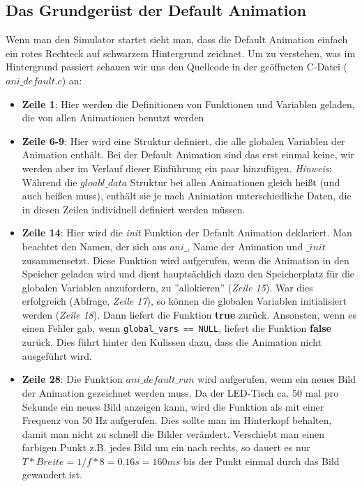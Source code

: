 \documentclass[10pt,a4paper]{article}
\begin{document}
\subsection{Das Grundgerüst der Default Animation}
Wenn man den Simulator startet sieht man, dass die Default Animation einfach ein rotes Rechteck auf schwarzem Hintergrund zeichnet.
Um zu verstehen, was im Hintergrund passiert schauen wir uns den Quellcode in der geöffneten C-Datei (\textit{$ani\_default.c$}) an:

\begin{itemize}
\item \textbf{Zeile 1}: Hier werden die Definitionen von Funktionen und Variablen geladen, die von allen Animationen benutzt werden

\item \textbf{Zeile 6-9}: Hier wird eine Struktur definiert, die alle globalen Variablen der Animation enthält. Bei der Default Animation sind das erst einmal keine, wir werden aber im Verlauf dieser Einführung ein paar hinzufügen. \textit{Hinweis}: Während die \textit{$gloabl\_data$} Struktur bei allen Animationen gleich heißt (und auch heißen muss), enthält sie je nach Animation unterschiedliche Daten, die in diesen Zeilen individuell definiert werden müssen.

\item \textbf{Zeile 14}: Hier wird die \textit{init} Funktion der Default Animation deklariert. Man beachtet den Namen, der sich aus \textit{$ani\_$}, Name der Animation und \textit{$\_init$} zusammensetzt. Diese Funktion wird aufgerufen, wenn die Animation in den Speicher geladen wird und dient hauptsächlich dazu den Speicherplatz für die globalen Variablen anzufordern, zu ''allokieren'' (\textit{Zeile 15}). War dies erfolgreich (Abfrage, \textit{Zeile 17}), so können die globalen Variablen initialisiert werden (\textit{Zeile 18}). Dann liefert die Funktion \textbf{true} zurück. Ansonsten, wenn es einen Fehler gab, wenn \lstinline|global_vars == NULL|, liefert die Funktion \textbf{false} zurück. Dies führt hinter den Kulissen dazu, dass die Animation nicht ausgeführt wird.

\item \textbf{Zeile 28}: Die Funktion \textit{$ani\_default\_run$} wird aufgerufen, wenn ein neues Bild der Animation gezeichnet werden muss. Da der LED-Tisch ca. 50 mal pro Sekunde ein neues Bild anzeigen kann, wird die Funktion als mit einer Frequenz von 50 Hz aufgerufen. Dies sollte man im Hinterkopf behalten, damit man nicht zu schnell die Bilder verändert. Verschiebt man einen farbigen Punkt z.B. jedes Bild um ein nach rechts, so dauert es nur $ T * Breite = 1/f * 8 = 0.16s = 160ms$ bis der Punkt einmal durch das Bild gewandert ist.


\end{itemize}
\end{document}
